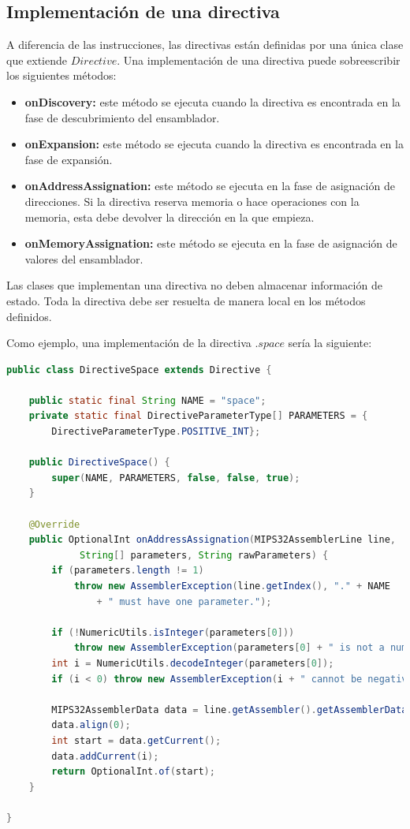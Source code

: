 \subsection{Implementación de una directiva}\label{subsec:implementacion-de-una-directiva}

A diferencia de las instrucciones, las directivas
están definidas por una única clase que extiende $Directive$.
Una implementación de una directiva puede sobreescribir los siguientes métodos:
\begin{itemize}
    \item \textbf{onDiscovery:} este método se ejecuta cuando la directiva
    es encontrada en la fase de descubrimiento del ensamblador.
    \item \textbf{onExpansion:} este método se ejecuta cuando la directiva
    es encontrada en la fase de expansión.
    \item \textbf{onAddressAssignation:} este método se ejecuta en la fase
    de asignación de direcciones.
    Si la directiva reserva memoria o hace operaciones con la memoria,
    esta debe devolver la dirección en la que empieza.
    \item \textbf{onMemoryAssignation:} este método se ejecuta en la fase
    de asignación de valores del ensamblador.
\end{itemize}

\noindent Las clases que implementan una directiva no deben
almacenar información de estado.
Toda la directiva debe ser resuelta de manera local en los métodos definidos.

\noindent Como ejemplo, una implementación de la directiva
$.space$ sería la siguiente:

\begin{lstlisting}[language=Java,style=java,frame=single,label={lst:directive-space}]
public class DirectiveSpace extends Directive {

    public static final String NAME = "space";
    private static final DirectiveParameterType[] PARAMETERS = {
        DirectiveParameterType.POSITIVE_INT};

    public DirectiveSpace() {
        super(NAME, PARAMETERS, false, false, true);
    }

    @Override
    public OptionalInt onAddressAssignation(MIPS32AssemblerLine line,
             String[] parameters, String rawParameters) {
        if (parameters.length != 1)
            throw new AssemblerException(line.getIndex(), "." + NAME
                + " must have one parameter.");

        if (!NumericUtils.isInteger(parameters[0]))
            throw new AssemblerException(parameters[0] + " is not a number.");
        int i = NumericUtils.decodeInteger(parameters[0]);
        if (i < 0) throw new AssemblerException(i + " cannot be negative.");

        MIPS32AssemblerData data = line.getAssembler().getAssemblerData();
        data.align(0);
        int start = data.getCurrent();
        data.addCurrent(i);
        return OptionalInt.of(start);
    }

}
\end{lstlisting}

